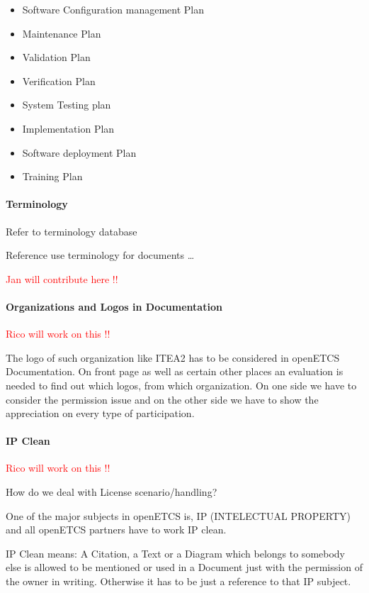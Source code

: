 \documentclass{template/openetcs_article}
\begin{document}
\begin{itemize}
\item Software Configuration management Plan
\item Maintenance Plan
\item Validation Plan
\item Verification Plan
\item System Testing plan  
\item Implementation Plan
\item Software deployment Plan
\item Training Plan
\end{itemize}


\paragraph{Terminology}
Refer to terminology database

Reference use terminology for documents {\dots} 

\textcolor{red}{Jan will contribute here !!}


\paragraph{Organizations and Logos in Documentation}
\textcolor{red}{Rico will work on this !!}

The logo of such organization like ITEA2 has to be considered in openETCS Documentation. On front page as well as certain other places an evaluation is needed to find out which logos, from which organization. On one side we have to consider the permission issue and on the other side we have to show the appreciation on every type of participation. 


\paragraph{IP Clean}
\textcolor{red}{Rico will work on this !!}

How do we deal with License scenario/handling? 

One of the major subjects in openETCS is, IP (INTELECTUAL PROPERTY) and all openETCS partners have to work IP clean.


IP Clean means: A Citation, a Text or a Diagram which belongs to somebody else is allowed to be mentioned or used in a Document just with the permission of the owner in writing. Otherwise it has to be just a reference to that IP subject.
\end{document}
